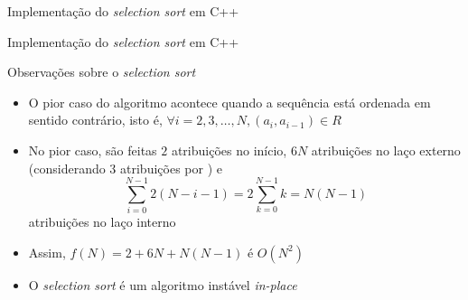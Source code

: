 \begin{frame}[fragile]{Implementação do {\it selection sort} em C++}
\end{frame}

\begin{frame}[fragile]{Implementação do {\it selection sort} em C++}
\end{frame}

\begin{frame}[fragile]{Observações sobre o {\it selection sort}}

    \begin{itemize}
        \item O pior caso do algoritmo acontece quando a sequência está ordenada em sentido 
            contrário, isto é, $\forall i = 2, 3, \ldots, N, (a_i, a_{i - 1})\in R$

        \item No pior caso, são feitas $2$ atribuições no início, $6N$ atribuições no laço externo 
            (considerando 3 atribuições por ) e
            \[
                \sum_{i = 0}^{N - 1} 2(N - i - 1) = 2\sum_{k = 0}^{N - 1} k = N(N - 1)
            \]
            atribuições no laço interno

        \item Assim, $f(N) = 2 + 6N + N(N - 1)$ é $O(N^2)$

        \item O \textit{selection sort} é um algoritmo instável \textit{in-place}
    \end{itemize}

\end{frame}

